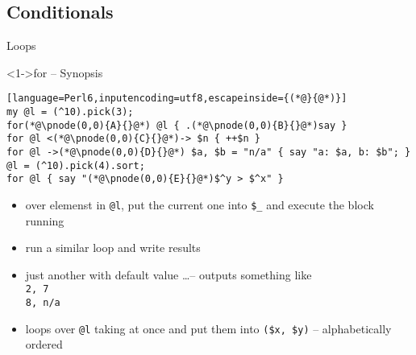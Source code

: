 \subsection{Conditionals}

\begin{frame}[fragile]{Loops}
\begin{block}<1->{for -- Synopsis}
\small
\begin{lstlisting}[language=Perl6,inputencoding=utf8,escapeinside={(*@}{@*)}]
my @l = (^10).pick(3);
for(*@\pnode(0,0){A}{}@*) @l { .(*@\pnode(0,0){B}{}@*)say }
for @l <(*@\pnode(0,0){C}{}@*)-> $n { ++$n }
for @l ->(*@\pnode(0,0){D}{}@*) $a, $b = "n/a" { say "a: $a, b: $b"; }
@l = (^10).pick(4).sort;
for @l { say "(*@\pnode(0,0){E}{}@*)$^y > $^x" }
\end{lstlisting}
\end{block}

\begin{itemize}
\item<2->  over elemenst in \texttt{@l}, put the current one into \texttt{\$\_} and execute the block running 
\item<3-> run a similar loop and write results 
\item<4-> just another  with default value \ldots -- outputs something like \texttt{\\
2, 7 \\
8, n/a}
\item<5-> loops over \texttt{@l} taking  at once and put them into \texttt{(\$x, \$y)} -- alphabetically ordered
\end{itemize}
\end{frame}

